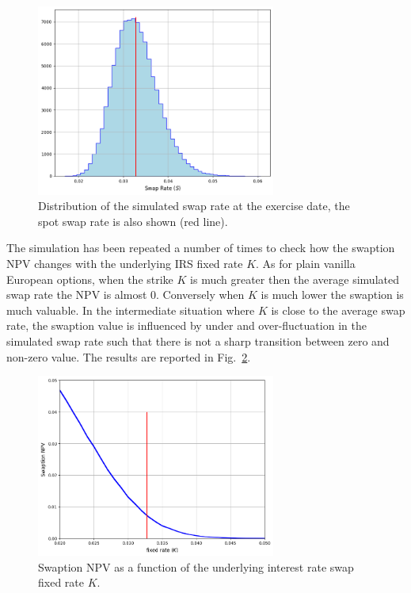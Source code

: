 \begin{figure}[htb]
	\centering
	\includegraphics[width=0.7\textwidth]{figures/simulated_swap_rate}
	\caption{Distribution of the simulated swap rate at the exercise date, the spot swap rate is also shown (red line).}
	\label{fig:swap_rate}
\end{figure}

The simulation has been repeated a number of times to check how the swaption NPV changes with the underlying IRS fixed rate $K$. As for plain vanilla European options, when the strike $K$ is much greater then the average simulated swap rate the NPV is almost 0. Conversely when $K$ is much lower the swaption is much valuable. In the intermediate situation where $K$ is close to the average swap rate, the swaption value is influenced by under and over-fluctuation in the simulated swap rate such that there is not a sharp transition between zero and non-zero value.
The results are reported in Fig.~\ref{fig:swaption_npv_vs_K}.

\begin{figure}[htb]
\centering
\includegraphics[width=0.7\textwidth]{figures/swaption_npv_vs_K}
\caption{Swaption NPV as a function of the underlying interest rate swap fixed rate $K$.}
\label{fig:swaption_npv_vs_K}
\end{figure}


